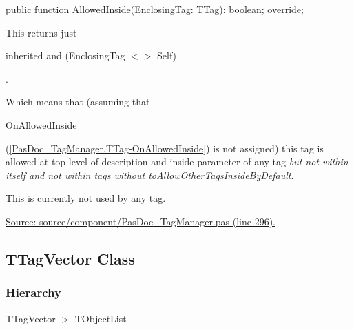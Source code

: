 \documentclass{report}
\newif\ifpdf
\begin{document}
\label{PasDoc_TagManager.TNonSelfTag-AllowedInside}
\begin{list}{}{
\setlength{\itemindent}{0cm}
\setlength{\listparindent}{0cm}
\setlength{\leftmargin}{\evensidemargin}
\addtolength{\leftmargin}{\tmplength}
\settowidth{\labelsep}{X}
\addtolength{\leftmargin}{\labelsep}
\setlength{\labelwidth}{\tmplength}
}
\item[\textbf{Declaration}\hfill]
\ifpdf
\begin{flushleft}
\fi
\begin{ttfamily}
public function AllowedInside(EnclosingTag: TTag): boolean; override;\end{ttfamily}

\ifpdf
\end{flushleft}
\fi

\par
\item[\textbf{Description}]
This returns just \begin{ttfamily}inherited and (EnclosingTag {$<$}{$>$} Self)\end{ttfamily}.

Which means that (assuming that \begin{ttfamily}OnAllowedInside\end{ttfamily}(\ref{PasDoc_TagManager.TTag-OnAllowedInside}) is not assigned) this tag is allowed at top level of description and inside parameter of any tag \textit{but not within itself and not within tags without toAllowOtherTagsInsideByDefault}.

This is currently not used by any tag.\par
\href{https://github.com/pasdoc/pasdoc/blob/master/source/component/PasDoc_TagManager.pas#L296}{Source: source/component/PasDoc{\_}TagManager.pas (line 296).}

\end{list}
\ifpdf
\subsection*{\large{\textbf{TTagVector Class}}\normalsize\hspace{1ex}\hrulefill}
\else
\subsection*{TTagVector Class}
\fi
\label{PasDoc_TagManager.TTagVector}
\subsubsection*{\large{\textbf{Hierarchy}}\normalsize\hspace{1ex}\hfill}
TTagVector {$>$} TObjectList
\end{document}
